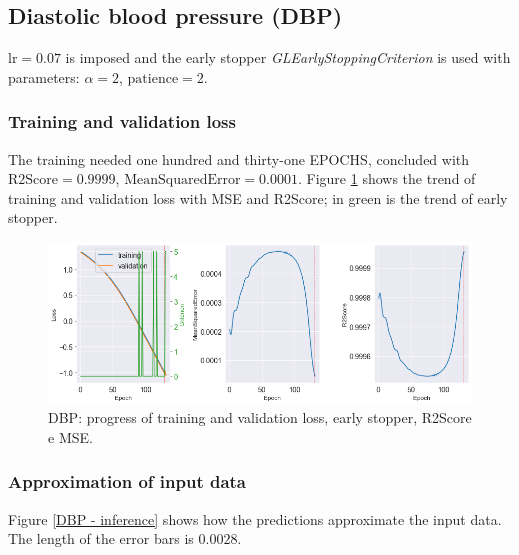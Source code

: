 \newpage
\subsection{Diastolic blood pressure (DBP)}
$\text{lr}=0.07$ is imposed and the early stopper \textit{GLEarlyStoppingCriterion} is used with parameters: $\alpha = 2$, $\text{patience}=2$.



\subsubsection{Training and validation loss}
The training needed one hundred and thirty-one EPOCHS, concluded with $\text{R2Score}=0.9999$, $\text{MeanSquaredError}=0.0001$. Figure \ref{DBP - loss} shows the trend of training and validation loss with MSE and R2Score; in green is the trend of early stopper.
\begin{figure}[h]
    \centering
    \includegraphics[width=1\textwidth]{images/Training (risultati)/DBP/DBP - loss.png}
    \caption{DBP: progress of training and validation loss, early stopper, R2Score e MSE.}
    \label{DBP - loss}
\end{figure}

\vspace{-0.5cm}

\subsubsection{Approximation of input data}
Figure \ref{DBP - inference} shows how the predictions approximate the input data. The length of the error bars is $0.0028$.

